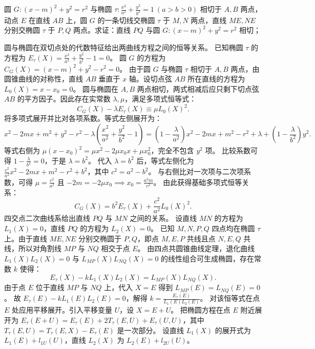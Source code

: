 \begin{example}
圆 $G: (x - m)^2 + y^2 = r^2$ 与椭圆 $\tau: \frac{x^2}{a^2} + \frac{y^2}{b^2} = 1\ (a > b > 0)$ 相切于 $A,B$ 两点，动点 $E$ 在直线 $AB$ 上，圆 $G$ 的一条切线交椭圆 $\tau$ 于 $M,N$ 两点，直线 $ME,NE$ 分别交椭圆 $\tau$ 于 $P,Q$ 两点。求证：直线 $PQ$ 与圆 $G: (x - m)^2 + y^2 = r^2$ 相切；
\end{example}
\begin{solution}
圆与椭圆在双切点处的代数特征给出两曲线方程之间的恒等关系。
已知椭圆 $\tau$ 的方程为 $E_\tau(X) = \frac{x^2}{a^2} + \frac{y^2}{b^2} - 1 = 0$。
圆 $G$ 的方程为 $C_G(X) = (x - m)^2 + y^2 - r^2 = 0$。
由于圆 $G$ 与椭圆 $\tau$ 相切于 $A, B$ 两点，由圆锥曲线的对称性，直线 $AB$ 垂直于 $x$ 轴。设切点弦 $AB$ 所在直线的方程为 $L_0(X) = x - x_0 = 0$。
圆与椭圆在 $A,B$ 两点相切，两式相减后应只剩下切点弦 $AB$ 的平方因子。因此存在实常数 $\lambda,\mu$，满足多项式恒等式：
\[ C_G(X) - \lambda E_\tau(X) \equiv \mu L_0(X)^2. \]
将多项式展开并比对各项系数。等式左侧展开为：
\[ x^2 - 2mx + m^2 + y^2 - r^2 - \lambda\left(\frac{x^2}{a^2} + \frac{y^2}{b^2} - 1\right) = \left(1 - \frac{\lambda}{a^2}\right)x^2 - 2mx + m^2 - r^2 + \lambda + \left(1 - \frac{\lambda}{b^2}\right)y^2. \]
等式右侧为 $\mu(x - x_0)^2 = \mu x^2 - 2\mu x_0 x + \mu x_0^2$，完全不包含 $y^2$ 项。
比较系数可得 $1 - \frac{\lambda}{b^2} = 0$，于是 $\lambda = b^2$。
代入 $\lambda = b^2$ 后，等式左侧化为 $\frac{c^2}{a^2}x^2 - 2mx + m^2 - r^2 + b^2$，其中 $c^2 = a^2 - b^2$。
与右侧比对一次项与二次项系数，可得 $\mu = \frac{c^2}{a^2}$ 且 $-2m = -2\mu x_0 \implies x_0 = \frac{a^2 m}{c^2}$。
由此获得基础多项式恒等关系：
\[ C_G(X) = b^2 E_\tau(X) + \frac{c^2}{a^2} L_0(X)^2. \]
四交点二次曲线系给出直线 $PQ$ 与 $MN$ 之间的关系。
设直线 $MN$ 的方程为 $L_1(X) = 0$，直线 $PQ$ 的方程为 $L_2(X) = 0$。
已知 $M, N, P, Q$ 四点均在椭圆 $\tau$ 上。由于直线 $ME, NE$ 分别交椭圆于 $P, Q$，即点 $M, E, P$ 共线且点 $N, E, Q$ 共线，所以对角割线 $MP$ 与 $NQ$ 相交于点 $E$。
由四点共圆锥曲线定理，退化曲线 $L_1(X) L_2(X) = 0$ 与 $L_{MP}(X) L_{NQ}(X) = 0$ 的线性组合可生成椭圆，存在常数 $k$ 使得：
\[ E_\tau(X) - k L_1(X) L_2(X) = L_{MP}(X) L_{NQ}(X). \]
由于点 $E$ 位于直线 $MP$ 与 $NQ$ 上，代入 $X = E$ 得到 $L_{MP}(E) = L_{NQ}(E) = 0$。
故 $E_\tau(E) - k L_1(E) L_2(E) = 0$，解得 $k = \frac{E_\tau(E)}{L_1(E) L_2(E)}$。
对该恒等式在点 $E$ 处应用平移展开。引入平移变量 $U$，设 $X = E + U$。
把椭圆方程在点 $E$ 附近展开为 $E_\tau(E+U) = E_\tau(E) + 2T_\tau(E, U) + E_\tau(U, U)$，其中 $T_\tau(E, U) = T_\tau(E, X) - E_\tau(E)$ 是一次部分。
设直线 $L_1(X)$ 的展开式为 $L_1(E) + l_{1U}(U)$，直线 $L_2(X)$ 为 $L_2(E) + l_{2U}(U)$。

\end{solution}
